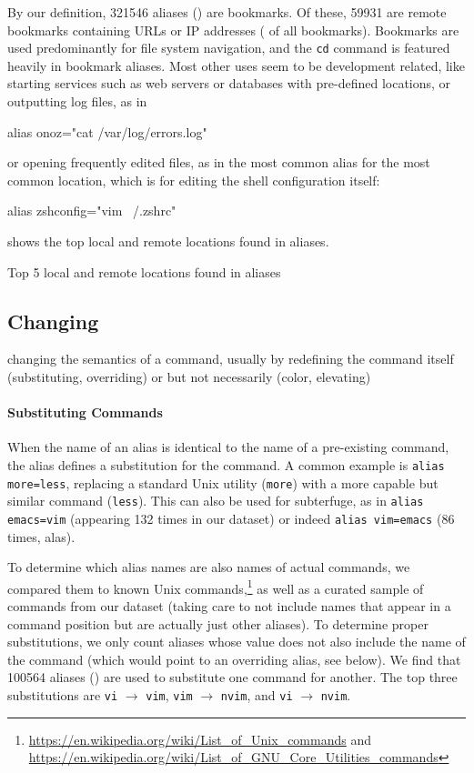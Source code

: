 By our definition, \num{321546} aliases () are bookmarks.
Of these, \num{59931} are remote bookmarks containing URLs or IP addresses ( of all bookmarks).
Bookmarks are used predominantly for file system navigation, and the \verb|cd| command is featured heavily in bookmark aliases.
Most other uses seem to be development related, like starting services such as web servers or databases with pre-defined locations,
or outputting log files, as in
\begin{CVerbatim}
alias onoz="cat /var/log/errors.log"
\end{CVerbatim}
or opening frequently edited files, as in the most common alias for the most common location, which is for editing the shell configuration itself:
\begin{CVerbatim}
alias zshconfig="vim ~/.zshrc"
\end{CVerbatim}
 shows the top local and remote locations found in aliases.

\begin{table}
    \caption{Top 5 local and remote locations found in aliases}
    \label{tab:locations}
    
\end{table}

\subsection{Changing}

\TODO changing the semantics of a command, usually by redefining the command itself (substituting, overriding) or but not necessarily (color, elevating)

\paragraph{\bf Substituting Commands}

When the name of an alias is identical to the name of a pre-existing command, the alias defines a substitution for the command.
A common example is \verb|alias more=less|, replacing a standard Unix utility (\verb|more|) with a more capable but similar command (\verb|less|).
This can also be used for subterfuge, as in \verb|alias emacs=vim| (appearing 132 times in our dataset) or indeed \verb|alias vim=emacs| (86 times, alas).

To determine which alias names are also names of actual commands, we compared them to known Unix commands,\footnote{\url{https://en.wikipedia.org/wiki/List_of_Unix_commands} and \url{https://en.wikipedia.org/wiki/List_of_GNU_Core_Utilities_commands}} as well as a curated sample of commands from our dataset (taking care to not include names that appear in a command position but are actually just other aliases).
To determine proper substitutions, we only count aliases whose value does not also include the name of the command (which would point to an overriding alias, see below).
We find that \num{100564} aliases () are used to substitute one command for another.
The top three substitutions are \verb|vi| $\rightarrow$ \verb|vim|, \verb|vim| $\rightarrow$ \verb|nvim|, and \verb|vi| $\rightarrow$ \verb|nvim|.

